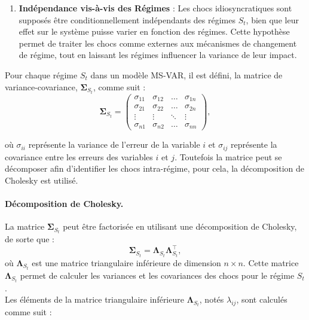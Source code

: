 \begin{sloppypar}
\begin{enumerate}
    \item \textbf{Indépendance vis-à-vis des Régimes} : Les chocs idiosyncratiques sont supposés être conditionnellement indépendants des régimes $S_t$, bien que leur effet sur le système puisse varier en fonction des régimes. Cette hypothèse permet de traiter les chocs comme externes aux mécanismes de changement de régime, tout en laissant les régimes influencer la variance de leur impact.
\end{enumerate}

Pour chaque régime $S_t$ dans un modèle MS-VAR, il est défini, la matrice de variance-covariance, $\bm{\Sigma}_{S_t}$, comme suit :
\begin{equation}
    \bm{\Sigma}_{S_t} = \begin{pmatrix}
        \sigma_{11} & \sigma_{12} & \dots & \sigma_{1n} \\
        \sigma_{21} & \sigma_{22} & \dots & \sigma_{2n} \\
        \vdots & \vdots & \ddots & \vdots \\
        \sigma_{n1} & \sigma_{n2} & \dots & \sigma_{nn}
    \end{pmatrix},
\end{equation}

où $\sigma_{ii}$ représente la variance de l'erreur de la variable $i$ et $\sigma_{ij}$ représente la covariance entre les erreurs des variables $i$ et $j$. Toutefois la matrice peut se décomposer afin d'identifier les chocs intra-régime, pour cela, la décomposition de Cholesky est utilisé.

\paragraph{Décomposition de Cholesky.} La matrice $\bm{\Sigma}_{S_t}$ peut être factorisée en utilisant une décomposition de Cholesky, de sorte que :
\begin{equation}
    \bm{\Sigma}_{S_t} = \bm{\Lambda}_{S_t} \bm{\Lambda}_{S_t}^\top,
\end{equation}
où $\bm{\Lambda}_{S_t}$ est une matrice triangulaire inférieure de dimension $n \times n$. Cette matrice $\bm{\Lambda}_{S_t}$ permet de calculer les variances et les covariances des chocs pour le régime $S_t$.\\

Les éléments de la matrice triangulaire inférieure $\bm{\Lambda}_{S_t}$, notés $\lambda_{ij}$, sont calculés comme suit :
\\


\end{sloppypar}
